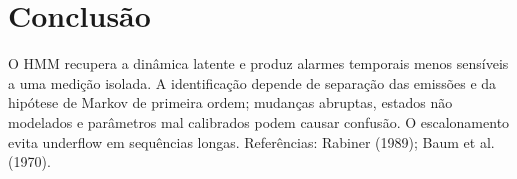 \documentclass[10pt,a4paper]{article}
\begin{document}
\section{Conclusão}
O HMM recupera a dinâmica latente e produz alarmes temporais menos sensíveis a uma medição isolada. A identificação depende de separação das emissões e da hipótese de Markov de primeira ordem; mudanças abruptas, estados não modelados e parâmetros mal calibrados podem causar confusão. O escalonamento evita underflow em sequências longas. Referências: Rabiner (1989); Baum et al. (1970).
\end{document}
